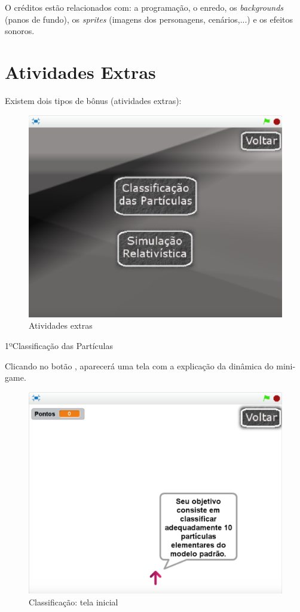 \documentclass[12pt,fleqn]{book} %
\begin{document}
O créditos estão relacionados com: a programação, o enredo, os \textit{backgrounds} (panos de fundo), os \textit{sprites} (imagens dos personagens, cenários,...) e os efeitos sonoros.

\section{Atividades Extras}
Existem dois tipos de bônus (atividades extras):

\begin{figure}[h]
	\centering
	\includegraphics[width=0.65 \textwidth]{Produto/extras}
	\caption{Atividades extras}
	\label{fig:app_a:extras}
\end{figure}

\newpage

1ºClassificação das Partículas

Clicando no botão , aparecerá uma tela com a explicação da dinâmica do mini-game.

\begin{figure}[h]
	\centering
	\includegraphics[width=0.65 \textwidth]{Produto/class1}
	\caption{Classificação: tela inicial}
	\label{fig:app_a:class1}
\end{figure}
\end{document}
